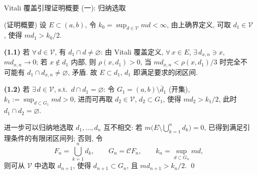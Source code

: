 
\begin{frame}{Vitali 覆盖引理证明概要 (一): 归纳选取}

\startproof[bg=yellow, fg=red](证明概要)
设 $E \subset (a, b)$, 令 $k_0 = \sup_{d \in \mathscr{V}} m d < \infty$,
由上确界定义, 可取 $d_1 \in \mathscr{V}$, 使得 $m d_1 > k_0 / 2$.

\textbf{(1.1)} 若 $\forall\, d \in \mathscr{V}$, 有 $d_1 \cap d \neq \varnothing$:
由 Vitali 覆盖定义, $\forall\, x \in E$, $\exists\, d_{x, n} \ni x$,
$m d_{x, n} \to 0$; 若 $x \notin d_1$ 内部, 则 $\rho(x, d_1) > 0$,
当 $m d_{x, n} < \rho(x, d_1)/3$ 时完全不可能有 $d_1 \cap d_{x, n} \neq \varnothing$,
矛盾. 故 $E \subset d_1$, $d_1$ 即满足要求的闭区间.

\textbf{(1.2)} 若 $\exists\, d \in \mathscr{V}$, s.t.\ $d \cap d_1 = \varnothing$:
令 $G_1 = (a, b) \setminus \bar{d}_1$ (开集),
$k_1 := \sup_{d \subset G_1} m d > 0$, 进而可再取 $d_2 \in \mathscr{V}$,
$d_2 \subset G_1$, 使得 $m d_2 > k_1 / 2$, 此时 $d_1 \cap d_2 = \varnothing$.

\pause

进一步可以归纳地选取 $d_1, \dots, d_n$ 互不相交:
若 $m \big( E \setminus \bigcup_{k=1}^{n} d_k \big) = 0$, 已得到满足引理条件的有限闭区间列;
否则, 令
\[
F_n = \bigcup_{k=1}^{n} d_k,
\qquad
G_n = \mathscr{C} F_n,
\qquad
k_n = \sup_{d \subset G_n} m d ,
\]
则可从 $\mathscr{V}$ 中选取 $d_{n+1}$, 使得 $d_{n+1} \subset G_n$,
且 $m d_{n+1} > k_n / 2$.
\qed

\end{frame}


